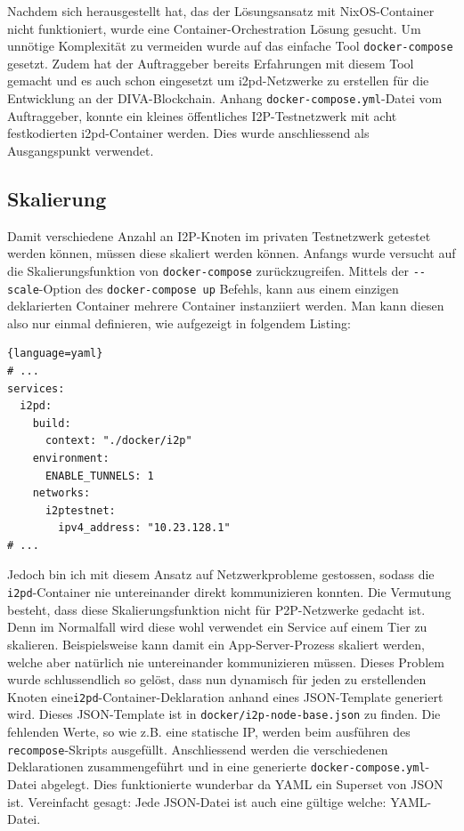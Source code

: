 Nachdem sich herausgestellt hat, das der Lösungsansatz mit NixOS-Container nicht funktioniert, wurde eine Container-Orchestration Lösung gesucht.
Um unnötige Komplexität zu vermeiden wurde auf das einfache Tool \lstinline|docker-compose| gesetzt.
Zudem hat der Auftraggeber bereits Erfahrungen mit diesem Tool gemacht und es auch schon eingesetzt um i2pd-Netzwerke zu erstellen
für die Entwicklung an der DIVA-Blockchain.
Anhang \lstinline|docker-compose.yml|-Datei vom Auftraggeber,
konnte ein kleines öffentliches I2P-Testnetzwerk mit acht festkodierten i2pd-Container werden.
Dies wurde anschliessend als Ausgangspunkt verwendet.

\subsection{Skalierung}\label{sec:scaling}

Damit verschiedene Anzahl an I2P-Knoten im privaten Testnetzwerk getestet werden können, müssen diese skaliert werden können.
Anfangs wurde versucht auf die Skalierungsfunktion von \lstinline|docker-compose| zurückzugreifen.
Mittels der \lstinline|--scale|-Option des \lstinline|docker-compose up| Befehls, kann aus einem einzigen deklarierten Container mehrere Container instanziiert werden. Man kann diesen also nur einmal definieren, wie aufgezeigt in folgendem Listing:
\begin{lstlisting}{language=yaml}
# ... 
services:
  i2pd:
    build:
      context: "./docker/i2p"
    environment:
      ENABLE_TUNNELS: 1
    networks:
      i2ptestnet:
        ipv4_address: "10.23.128.1"
# ...  
\end{lstlisting}

Jedoch bin ich mit diesem Ansatz auf Netzwerkprobleme gestossen,
sodass die \lstinline|i2pd|-Container nie untereinander direkt kommunizieren konnten.
Die Vermutung besteht, dass diese Skalierungsfunktion nicht für P2P-Netzwerke gedacht ist.
Denn im Normalfall wird diese wohl verwendet ein Service auf einem Tier zu skalieren.
Beispielsweise kann damit ein App-Server-Prozess skaliert werden, welche aber natürlich nie untereinander kommunizieren müssen.
Dieses Problem wurde schlussendlich so gelöst,
dass nun dynamisch für jeden zu erstellenden Knoten eine\lstinline|i2pd|-Container-Deklaration anhand eines JSON-Template generiert wird.
Dieses JSON-Template ist in \lstinline|docker/i2p-node-base.json| zu finden.
Die fehlenden Werte, so wie z.B. eine statische IP, werden beim ausführen des \lstinline|recompose|-Skripts ausgefüllt.
Anschliessend werden die verschiedenen Deklarationen zusammengeführt und in eine generierte \lstinline|docker-compose.yml|-Datei abgelegt.
Dies funktionierte wunderbar da YAML ein Superset von JSON ist. Vereinfacht gesagt: Jede JSON-Datei ist auch eine gültige welche: YAML-Datei.


